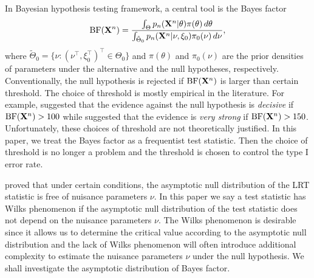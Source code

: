 \documentclass[11pt]{article}
\theoremstyle{plain}
\theoremstyle{definition}
\theoremstyle{remark}
\begin{document}
In Bayesian hypothesis testing framework, a central tool is the Bayes factor
\begin{equation*}
    \text{BF}(\mathbf{X}^{n})=
    \frac{\int_{\Theta} p_n(\mathbf{X}^{n}|\theta)\pi(\theta)\, d\theta}{\int_{\tilde{\Theta}_0}p_n(\mathbf{X}^{n}|\nu,\xi_0)\pi_0(\nu)\, d\nu},
\end{equation*}
where $\tilde{\Theta}_0=\{\nu: (\nu^\top ,\xi_0^\top )^\top \in \Theta_0\}$ and $\pi(\theta)$ and $\pi_0(\nu)$ are the prior densities of parameters under the alternative and the  null hypotheses, respectively.
Conventionally, the null hypothesis is rejected if $\text{BF}(\mathbf{X}^n)$ is larger than certain threshold.
The choice of threshold is mostly empirical in the literature.
For example, \cite{Jeffreys1961} suggested that the evidence against the null hypothesis is \emph{decisive} if $\text{BF}(\mathbf{X}^n)>100$ while \cite{Robert1995Bayes} suggested that the evidence is \emph{very strong} if $\text{BF}(\mathbf{X}^n) > 150$.
Unfortunately, these choices of threshold  are not theoretically justified.
In this paper, we treat the Bayes factor as a frequentist test statistic.
Then the choice of threshold is no longer a problem and the threshold is chosen to control the type I error rate.


\cite{Wilks1938The} proved that under certain conditions, the asymptotic null distribution of the LRT statistic is free of nuisance parameters $\nu$.
In this paper we say a test statistic has Wilks phenomenon if the asymptotic null distribution of the test statistic does not depend on the nuisance parameters $\nu$.
The Wilks phenomenon is desirable since it allows us to determine the critical value according to the asymptotic null distribution and the lack of Wilks phenomenon will often introduce additional complexity to estimate the nuisance parameters $\nu$ under the null hypothesis.
We shall investigate the asymptotic distribution of Bayes factor.
\end{document}
